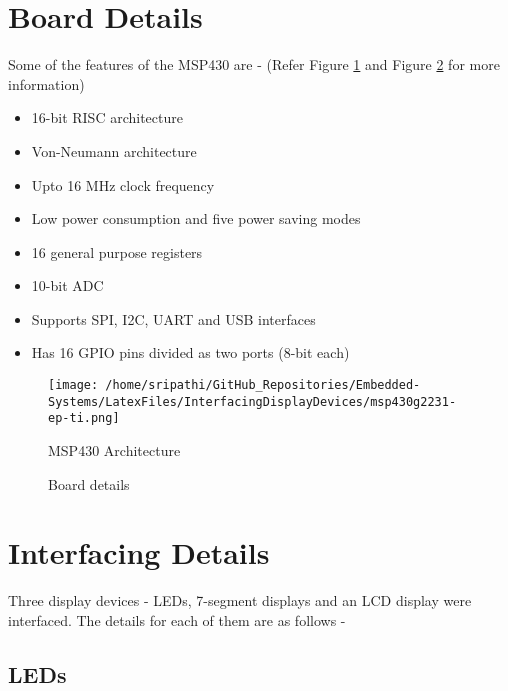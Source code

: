 \documentclass[12pt, letterpaper]{article}
\begin{document}
\section{Board Details}

Some of the features of the MSP430 are - (Refer Figure \ref{fig:architecture} and Figure \ref{fig:board} for more information)

\begin{itemize}
	\item 16-bit RISC architecture
	\item Von-Neumann architecture
	\item Upto 16 MHz clock frequency
	\item Low power consumption and five power saving modes
	\item 16 general purpose registers
	\item 10-bit ADC
	\item Supports SPI, I2C, UART and USB interfaces
	\item Has 16 GPIO pins divided as two ports (8-bit each)
\end{itemize}
	
\begin{figure}[t]
	\centering
	\texttt{[image: /home/sripathi/GitHub\_Repositories/Embedded-Systems/LatexFiles/InterfacingDisplayDevices/msp430g2231-ep-ti.png]}
	\caption{MSP430 Architecture}
	\label{fig:architecture}
\end{figure}

\begin{figure}[t]
	\centering
		\caption{Board details}
		\label{fig:board}
\end{figure}

\section{Interfacing Details}

Three display devices - LEDs, 7-segment displays and an LCD display were interfaced. The details for each of them are as follows - 

\subsection{LEDs}
\end{document}
